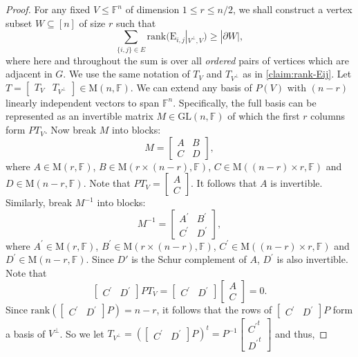 \documentclass{toc}
\theoremstyle{plain}
\numberwithin{equation}{section}
\theoremstyle{definition}
\newcommand{\GL}{\mathrm{GL}}
\newcommand{\F}{\mathbb{F}}
\newcommand{\rk}{\mathrm{rank}}
\newcommand{\M}{\mathrm{M}}
\newcommand{\E}{\mathrm{E}}
\newcommand{\ann}{V^{\perp}}
\newcommand\smat[1]{\left[\begin{smallmatrix}#1\end{smallmatrix}\right]}
\begin{document}
\begin{proof}
    For any fixed $V\leq\F^n$ of dimension $1\leq r\leq n/2$, we shall construct a vertex subset $W\subseteq[n]$ of size $r$ such that 
    \[
        \sum_{\{i,j\}\in E}\rk(\E_{i,j}|_{\ann, V})\geq |\partial W|,
    \]
    where here and throughout the sum is over all \emph{ordered} pairs of vertices which are adjacent in $G$.
    We use the same notation of $T_V$ and $T_{\ann}$ as in \cref{claim:rank-Eij}. Let $T = \begin{bmatrix}T_V&T_{\ann}\end{bmatrix}\in\M(n,\F)$. 
    We can extend any basis of $P(V)$ with $(n-r)$ linearly independent vectors to span $\F^n$. Specifically, the full basis can be represented as an invertible matrix $M\in\GL(n,\F)$ of which the first $r$ columns form $PT_V$. Now break $M$ into blocks:
    $$
    M=
    \begin{bmatrix}
        A&B\\
        C&D
    \end{bmatrix},
    $$
    where $A\in\M(r,\F)$, $B\in\M(r\times(n-r),\F)$, $C\in\M((n-r)\times r,\F)$ and $D\in\M(n-r,\F)$. Note that $PT_V=\smat{A\\C}$. It follows that $A$ is invertible. Similarly, break $M^{-1}$ into blocks:
    $$
    M^{-1}=
    \begin{bmatrix}
        A^{\prime}&B^{\prime}\\
        C^{\prime}&D^{\prime}
    \end{bmatrix},
    $$
    where $A^{\prime}\in\M(r,\F)$, $B^{\prime}\in\M(r\times(n-r),\F)$, $C^{\prime}\in\M((n-r)\times r,\F)$ and $D^{\prime}\in\M(n-r,\F)$. Since $D'$ is the Schur complement of $A$,
    $D^{\prime}$ is also invertible. Note that
    $$
    \begin{bmatrix}C^{\prime}&D^{\prime}\end{bmatrix}PT_V=\begin{bmatrix}C^{\prime}&D^{\prime}\end{bmatrix}\begin{bmatrix}A\\C\end{bmatrix}=0.
    $$
    Since $\rk(\begin{bmatrix}C^{\prime}&D^{\prime}\end{bmatrix}P)=n-r$, it follows that the rows of $\begin{bmatrix}C^{\prime}&D^{\prime}\end{bmatrix}P$ form a basis of $\ann$. So we let $T_{\ann}=(\begin{bmatrix}C^{\prime}&D^{\prime}\end{bmatrix}P)^t=P^{-1}\smat{{C^{\prime}}^t\\{D^{\prime}}^t}$ and thus,

\end{proof}
\end{document}
